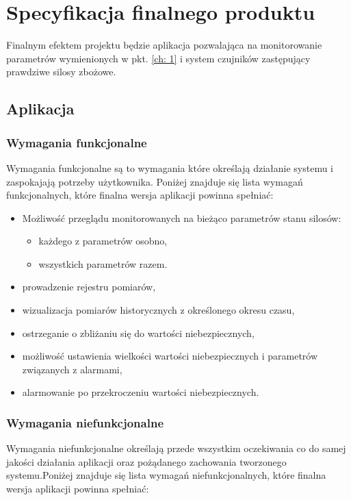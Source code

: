 \section{Specyfikacja finalnego produktu} \label{ch: 2}
    Finalnym efektem projektu będzie aplikacja pozwalająca na monitorowanie parametrów
    wymienionych w pkt. \ref{ch: 1} i system czujników zastępujący prawdziwe silosy zbożowe.
    \subsection{Aplikacja} 
        \subsubsection{Wymagania funkcjonalne}
            Wymagania funkcjonalne są to wymagania które określają działanie systemu i zaspokajają potrzeby użytkownika.
            Poniżej znajduje się lista wymagań funkcjonalnych, które finalna wersja aplikacji powinna spełniać:
            \begin{itemize}
                \item Możliwość przeglądu monitorowanych na bieżąco parametrów stanu silosów:
                \begin{itemize}
                    \item każdego z parametrów osobno,
                    \item wszystkich parametrów razem.
                \end{itemize}
                \item prowadzenie rejestru pomiarów,
                \item wizualizacja pomiarów historycznych z określonego okresu czasu,
                \item ostrzeganie o zbliżaniu się do wartości niebezpiecznych,
                \item możliwość ustawienia wielkości wartości niebezpiecznych i parametrów związanych z alarmami,
                \item alarmowanie po przekroczeniu wartości niebezpiecznych.
            \end{itemize}
        \subsubsection{Wymagania niefunkcjonalne}
        Wymagania niefunkcjonalne określają przede wszystkim oczekiwania co do samej jakości działania 
        aplikacji oraz pożądanego zachowania tworzonego systemu.Poniżej znajduje się lista wymagań 
        niefunkcjonalnych, które finalna wersja aplikacji powinna spełniać:

